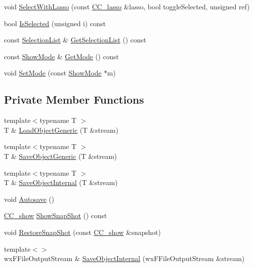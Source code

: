 \begin{DoxyCompactItemize}
\item 
void \hyperlink{a00020_a48d9d1df2b7f47503bacc610f432d48a}{Select\-With\-Lasso} (const \hyperlink{a00033}{C\-C\-\_\-lasso} \&lasso, bool toggle\-Selected, unsigned ref)
\item 
bool \hyperlink{a00020_a2666154ab00c2127fb8740a77ae04856}{Is\-Selected} (unsigned i) const 
\item 
const \hyperlink{a00214_aaec86d4bb87e1e6f0b60e6e551c5e570}{Selection\-List} \& \hyperlink{a00020_a9916a116564564d7c3e90021dabb86e4}{Get\-Selection\-List} () const 
\item 
const \hyperlink{a00140}{Show\-Mode} \& \hyperlink{a00020_a231e6c0aeefd7afec51a49db5d1349af}{Get\-Mode} () const 
\item 
void \hyperlink{a00020_a72e6705427c5773fcd1df68c95f2e9d2}{Set\-Mode} (const \hyperlink{a00140}{Show\-Mode} $\ast$m)
\end{DoxyCompactItemize}
\subsection*{Private Member Functions}
\begin{DoxyCompactItemize}
\item 
{\footnotesize template$<$typename T $>$ }\\T \& \hyperlink{a00020_aabfbb31b7de0e12f2e27995ac2d1209c}{Load\-Object\-Generic} (T \&stream)
\item 
{\footnotesize template$<$typename T $>$ }\\T \& \hyperlink{a00020_a62d5b478a611035540c73debd4acd931}{Save\-Object\-Generic} (T \&stream)
\item 
{\footnotesize template$<$typename T $>$ }\\T \& \hyperlink{a00020_a1096edf60a2763abbf3515cdd50a03ae}{Save\-Object\-Internal} (T \&stream)
\item 
void \hyperlink{a00020_a12175e69b77c48480c4e3ddd63917798}{Autosave} ()
\item 
\hyperlink{a00046}{C\-C\-\_\-show} \hyperlink{a00020_acf62d914a19a769892d16ee3648ac94c}{Show\-Snap\-Shot} () const 
\item 
void \hyperlink{a00020_a62683f9baddb64becf2e233c30fc202a}{Restore\-Snap\-Shot} (const \hyperlink{a00046}{C\-C\-\_\-show} \&snapshot)
\item 
{\footnotesize template$<$$>$ }\\wx\-F\-File\-Output\-Stream \& \hyperlink{a00020_ae810c29cd5c949ba61017646cd5ce093}{Save\-Object\-Internal} (wx\-F\-File\-Output\-Stream \&stream)
\end{DoxyCompactItemize}

